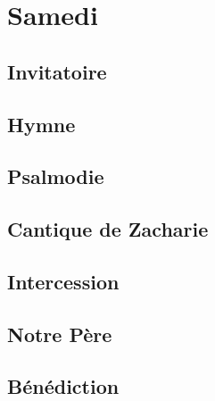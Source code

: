 \section[Samedi]{Samedi}
\begin{french}
\subsection*{Invitatoire}


%

\subsection*{Hymne}


\newpage \subsection*{Psalmodie}




\newpage 


\vspace{-1em}
\subsection*{Cantique de Zacharie}


\subsection*{Intercession}


\subsection*{Notre Père}




\subsection*{Bénédiction}

\end{french}


